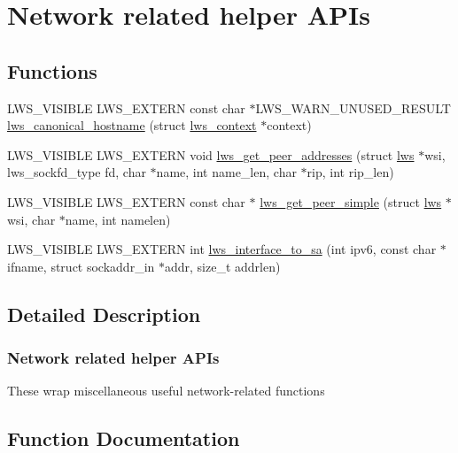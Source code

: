 \hypertarget{group__net}{}\section{Network related helper A\+P\+Is}
\label{group__net}
\subsection*{Functions}
\begin{DoxyCompactItemize}
\item 
L\+W\+S\+\_\+\+V\+I\+S\+I\+B\+LE L\+W\+S\+\_\+\+E\+X\+T\+E\+RN const char $\ast$L\+W\+S\+\_\+\+W\+A\+R\+N\+\_\+\+U\+N\+U\+S\+E\+D\+\_\+\+R\+E\+S\+U\+LT \hyperlink{group__net_gad0df22db2be9fc65a667a1e83f9a92a4}{lws\+\_\+canonical\+\_\+hostname} (struct \hyperlink{structlws__context}{lws\+\_\+context} $\ast$context)
\item 
L\+W\+S\+\_\+\+V\+I\+S\+I\+B\+LE L\+W\+S\+\_\+\+E\+X\+T\+E\+RN void \hyperlink{group__net_ga092e5f473b3347f03ffeef8a950080f3}{lws\+\_\+get\+\_\+peer\+\_\+addresses} (struct \hyperlink{structlws}{lws} $\ast$wsi, lws\+\_\+sockfd\+\_\+type fd, char $\ast$name, int name\+\_\+len, char $\ast$rip, int rip\+\_\+len)
\item 
L\+W\+S\+\_\+\+V\+I\+S\+I\+B\+LE L\+W\+S\+\_\+\+E\+X\+T\+E\+RN const char $\ast$ \hyperlink{group__net_ga7d797079325898c2a9c8ec9d3d356d33}{lws\+\_\+get\+\_\+peer\+\_\+simple} (struct \hyperlink{structlws}{lws} $\ast$wsi, char $\ast$name, int namelen)
\item 
L\+W\+S\+\_\+\+V\+I\+S\+I\+B\+LE L\+W\+S\+\_\+\+E\+X\+T\+E\+RN int \hyperlink{group__net_ga869d8bdffb0f2a7ce08e3ce10d6be3d8}{lws\+\_\+interface\+\_\+to\+\_\+sa} (int ipv6, const char $\ast$ifname, struct sockaddr\+\_\+in $\ast$addr, size\+\_\+t addrlen)
\end{DoxyCompactItemize}


\subsection{Detailed Description}
\subsubsection*{Network related helper A\+P\+Is}

These wrap miscellaneous useful network-\/related functions 

\subsection{Function Documentation}
\mbox{\label{group__net_gad0df22db2be9fc65a667a1e83f9a92a4}} 

